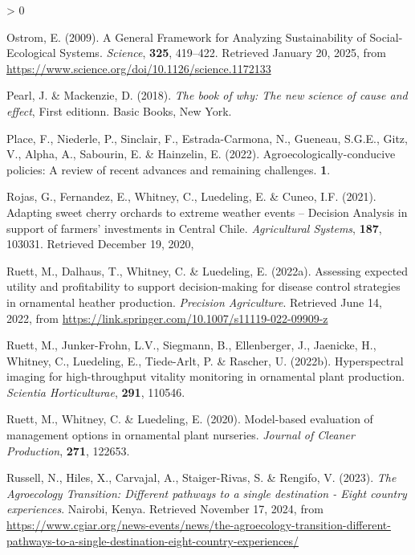 \documentclass[
]{article}
\newlength{\cslhangindent}
\newenvironment{CSLReferences}[2] %
 {%
  \setlength{\parindent}{0pt}
  \ifodd #1 \everypar{\setlength{\hangindent}{\cslhangindent}}\ignorespaces\fi
  \ifnum #2 > 0
  \setlength{\parskip}{#2\baselineskip}
  \fi
 }%
 {}
\begin{document}
\begin{CSLReferences}{1}{0}
\leavevmode{}%
Ostrom, E. (2009). A {General} {Framework} for {Analyzing}
{Sustainability} of {Social}-{Ecological} {Systems}. \emph{Science},
\textbf{325}, 419--422. Retrieved January 20, 2025, from
\url{https://www.science.org/doi/10.1126/science.1172133}

\leavevmode{}%
Pearl, J. \& Mackenzie, D. (2018). \emph{The book of why: The new
science of cause and effect}, First editionn. Basic Books, New York.

\leavevmode{}%
Place, F., Niederle, P., Sinclair, F., Estrada-Carmona, N., Gueneau,
S.G.E., Gitz, V., Alpha, A., Sabourin, E. \& Hainzelin, E. (2022).
Agroecologically-conducive policies: {A} review of recent advances and
remaining challenges. \textbf{1}.

\leavevmode{}%
Rojas, G., Fernandez, E., Whitney, C., Luedeling, E. \& Cuneo, I.F.
(2021). Adapting sweet cherry orchards to extreme weather events --
{Decision} {Analysis} in support of farmers' investments in {Central}
{Chile}. \emph{Agricultural Systems}, \textbf{187}, 103031. Retrieved
December 19, 2020,

\leavevmode{}%
Ruett, M., Dalhaus, T., Whitney, C. \& Luedeling, E. (2022a). Assessing
expected utility and profitability to support decision-making for
disease control strategies in ornamental heather production.
\emph{Precision Agriculture}. Retrieved June 14, 2022, from
\url{https://link.springer.com/10.1007/s11119-022-09909-z}

\leavevmode{}%
Ruett, M., Junker-Frohn, L.V., Siegmann, B., Ellenberger, J., Jaenicke,
H., Whitney, C., Luedeling, E., Tiede-Arlt, P. \& Rascher, U. (2022b).
Hyperspectral imaging for high-throughput vitality monitoring in
ornamental plant production. \emph{Scientia Horticulturae},
\textbf{291}, 110546.

\leavevmode{}%
Ruett, M., Whitney, C. \& Luedeling, E. (2020). Model-based evaluation
of management options in ornamental plant nurseries. \emph{Journal of
Cleaner Production}, \textbf{271}, 122653.

\leavevmode{}%
Russell, N., Hiles, X., Carvajal, A., Staiger-Rivas, S. \& Rengifo, V.
(2023). \emph{The {Agroecology} {Transition}: {Different} pathways to a
single destination - {Eight} country experiences}. Nairobi, Kenya.
Retrieved November 17, 2024, from
\url{https://www.cgiar.org/news-events/news/the-agroecology-transition-different-pathways-to-a-single-destination-eight-country-experiences/}


\end{CSLReferences}
\end{document}
